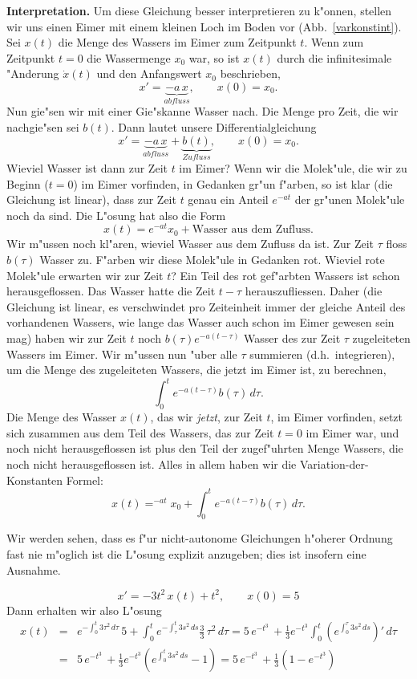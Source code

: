 {\bf Interpretation.} Um diese Gleichung besser interpretieren zu k"onnen, 
stellen wir uns einen Eimer mit einem kleinen Loch im Boden vor (Abb.~\ref{varkonstint}). Sei $x(t)$
die Menge des Wassers im Eimer zum Zeitpunkt $t$. Wenn  zum Zeitpunkt
$t=0$ die Wassermenge $x_0$ war, so ist $x(t)$ durch die infinitesimale "Anderung $\dot x(t)$ und den Anfangswert $x_0$ beschrieben,
$$ x' = \underbrace{-a\, x}_{abfluss},\qquad x(0)=x_0.$$
Nun gie"sen wir mit einer Gie"skanne Wasser nach. Die Menge pro Zeit, die wir nachgie"sen sei $b(t)$. Dann lautet unsere Differentialgleichung
$$ x' = \underbrace{-a\, x}_{abfluss}+ \underbrace{b(t)}_{Zufluss},\qquad x(0)=x_0.$$
Wieviel Wasser ist dann zur Zeit $t$ im Eimer? Wenn wir die Molek"ule, die wir
zu Beginn ($t=0$) im Eimer vorfinden, in Gedanken gr"un f"arben, so ist klar 
(die Gleichung ist linear), dass zur Zeit $t$ genau ein Anteil $e^{-a t}$
der gr"unen Molek"ule noch da sind. Die L"osung hat also die Form
$$ x(t) = e^{-a t} x_0+\mbox{Wasser aus dem Zufluss}.$$
Wir m"ussen noch kl"aren, wieviel Wasser aus dem Zufluss da ist. Zur Zeit $\tau$
floss $b(\tau)$ Wasser zu. F"arben wir diese Molek"ule in Gedanken rot. Wieviel 
rote Molek"ule erwarten wir zur Zeit $t$? Ein Teil des rot gef"arbten Wassers 
ist schon herausgeflossen. Das Wasser hatte die Zeit 
$t-\tau$ herauszufliessen. Daher (die Gleichung ist linear, es verschwindet pro 
Zeiteinheit immer der gleiche Anteil des vorhandenen Wassers, wie lange das Wasser auch schon im Eimer gewesen sein mag) haben wir zur Zeit $t$ noch 
$b(\tau)e^{-a(t-\tau)}$ Wasser des zur Zeit $\tau$ zugeleiteten Wassers im Eimer. Wir m"ussen nun "uber alle $\tau$ summieren (d.h.\ integrieren), um 
die Menge des zugeleiteten Wassers, die jetzt im Eimer ist, zu berechnen, 
$$ \int_0^t e^{-a(t-\tau)} b(\tau)\, d\tau.$$
Die Menge des Wasser $x(t)$, das wir {\it jetzt}, zur Zeit $t$, 
im Eimer vorfinden, setzt sich zusammen aus dem Teil des Wassers, 
das zur Zeit $t=0$ im Eimer war, und noch nicht herausgeflossen ist 
plus den Teil der zugef"uhrten Menge Wassers, die noch nicht 
herausgeflossen ist.
Alles in allem haben wir die Variation-der-Konstanten Formel:
$$ x(t) = ^{-a t}x_0 + \int_0^t e^{-a(t-\tau)} b(\tau)\, d\tau.$$
\par\medskip

Wir werden sehen, dass es f"ur nicht-autonome Gleichungen h"oherer Ordnung
fast nie m"oglich ist die L"osung
explizit anzugeben; dies ist insofern eine Ausnahme.
\begin{bbspX}
$$ x' = - 3 t^2\, x(t) + t^2,\qquad x(0) = 5$$
Dann erhalten wir also L"osung
\begin{eqnarray*} 
x(t) 
& = & e^{-\int_0^t 3 \tau^2\, d\tau}\,5 + \int_0^t  e^{-\int_\tau^t 3 s^2\, ds}\frac 3 3 \, \tau ^2\, d\tau
= 5\,e^{-t^3}\, + \frac 1 3 e^{-t^3}\int_0^t  \left(e^{\int_0^\tau 3 s^2\, ds} \right)'\, d\tau\\
& =& 5\,e^{-t^3}\, + \frac 1 3 e^{-t^3} 
           \left( e^{\int_0^t 3 s^2\, ds} -1\right)
= 5\,e^{-t^3}\, + \frac 1 3 
           \left( 1 -e^{-t^3} \right)           
\end{eqnarray*}
\end{bbspX}

